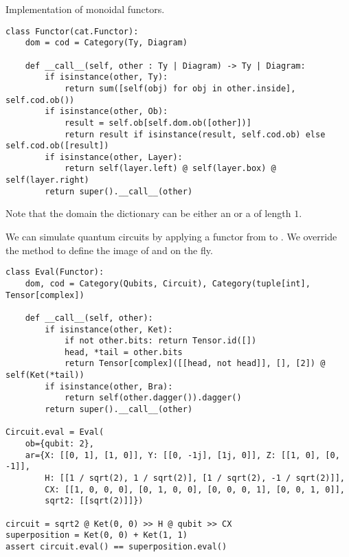 \begin{python}
{\normalfont Implementation of monoidal functors.}
\begin{verbatim}
class Functor(cat.Functor):
    dom = cod = Category(Ty, Diagram)

    def __call__(self, other : Ty | Diagram) -> Ty | Diagram:
        if isinstance(other, Ty):
            return sum([self(obj) for obj in other.inside], self.cod.ob())
        if isinstance(other, Ob):
            result = self.ob[self.dom.ob([other])]
            return result if isinstance(result, self.cod.ob) else self.cod.ob([result])
        if isinstance(other, Layer):
            return self(layer.left) @ self(layer.box) @ self(layer.right)
        return super().__call__(other)
\end{verbatim}

Note that the domain the dictionary  can be either an  or a  of length $1$.
\end{python}

\begin{example}
We can simulate quantum circuits by applying a functor from  to .
We override the  method to define the image of  and  on the fly.

\begin{verbatim}
class Eval(Functor):
    dom, cod = Category(Qubits, Circuit), Category(tuple[int], Tensor[complex])

    def __call__(self, other):
        if isinstance(other, Ket):
            if not other.bits: return Tensor.id([])
            head, *tail = other.bits
            return Tensor[complex]([[head, not head]], [], [2]) @ self(Ket(*tail))
        if isinstance(other, Bra):
            return self(other.dagger()).dagger()
        return super().__call__(other)

Circuit.eval = Eval(
    ob={qubit: 2},
    ar={X: [[0, 1], [1, 0]], Y: [[0, -1j], [1j, 0]], Z: [[1, 0], [0, -1]],
        H: [[1 / sqrt(2), 1 / sqrt(2)], [1 / sqrt(2), -1 / sqrt(2)]],
        CX: [[1, 0, 0, 0], [0, 1, 0, 0], [0, 0, 0, 1], [0, 0, 1, 0]],
        sqrt2: [[sqrt(2)]]})

circuit = sqrt2 @ Ket(0, 0) >> H @ qubit >> CX
superposition = Ket(0, 0) + Ket(1, 1)
assert circuit.eval() == superposition.eval()
\end{verbatim}
\end{example}

